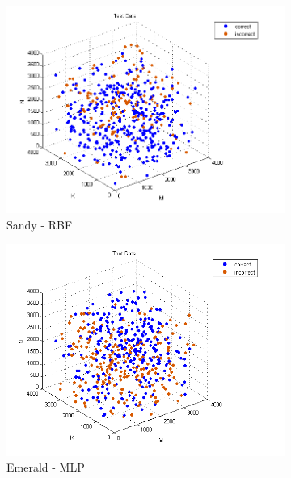 \begin{figure}[t]
        \begin{subfigure}[t]{0.33\textwidth}
            \includegraphics[width=\textwidth]{figures/sandy_test_rbf.png}
            \caption{Sandy - RBF}
            \label{f:classify_rbf_sandy}
        \end{subfigure}
    \centering
        \begin{subfigure}[t]{0.33\textwidth}
            \includegraphics[width=\textwidth]{figures/emerald_test_mlp.png}
            \caption{Emerald - MLP}
            \label{f:classify_mlp_emerald}
        \end{subfigure}
        \begin{subfigure}[t]{0.33\textwidth}

\end{subfigure}
\end{figure}
